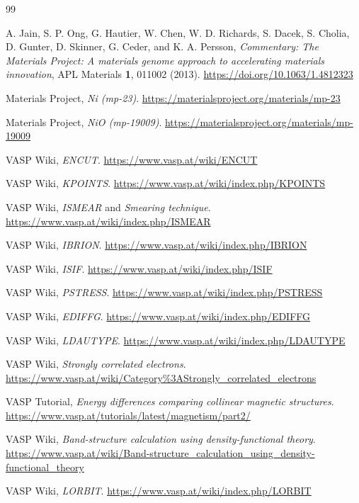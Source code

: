 \documentclass[12pt,a4paper]{article}
\begin{document}
\newpage
\begin{thebibliography}{99}

A. Jain, S. P. Ong, G. Hautier, W. Chen, W. D. Richards, S. Dacek,
S. Cholia, D. Gunter, D. Skinner, G. Ceder, and K. A. Persson,
\emph{Commentary: The Materials Project: A materials genome approach to
accelerating materials innovation}, APL Materials \textbf{1}, 011002 (2013).
\url{https://doi.org/10.1063/1.4812323}

Materials Project, \emph{Ni (mp-23)}.
\url{https://materialsproject.org/materials/mp-23}

Materials Project, \emph{NiO (mp-19009)}.
\url{https://materialsproject.org/materials/mp-19009}

VASP Wiki, \emph{ENCUT}.
\url{https://www.vasp.at/wiki/ENCUT}

VASP Wiki, \emph{KPOINTS}.
\url{https://www.vasp.at/wiki/index.php/KPOINTS}

VASP Wiki, \emph{ISMEAR} and \emph{Smearing technique}.
\url{https://www.vasp.at/wiki/index.php/ISMEAR}

VASP Wiki, \emph{IBRION}.
\url{https://www.vasp.at/wiki/index.php/IBRION}

VASP Wiki, \emph{ISIF}.
\url{https://www.vasp.at/wiki/index.php/ISIF}

VASP Wiki, \emph{PSTRESS}.
\url{https://www.vasp.at/wiki/index.php/PSTRESS}

VASP Wiki, \emph{EDIFFG}.
\url{https://www.vasp.at/wiki/index.php/EDIFFG}

VASP Wiki, \emph{LDAUTYPE}.
\url{https://www.vasp.at/wiki/index.php/LDAUTYPE}

VASP Wiki, \emph{Strongly correlated electrons}.
\url{https://www.vasp.at/wiki/Category%3AStrongly_correlated_electrons}

VASP Tutorial, \emph{Energy differences comparing collinear magnetic structures}.
\url{https://www.vasp.at/tutorials/latest/magnetism/part2/}

VASP Wiki, \emph{Band-structure calculation using density-functional theory}.
\url{https://www.vasp.at/wiki/Band-structure_calculation_using_density-functional_theory}

VASP Wiki, \emph{LORBIT}.
\url{https://www.vasp.at/wiki/index.php/LORBIT}


\end{thebibliography}
\end{document}
